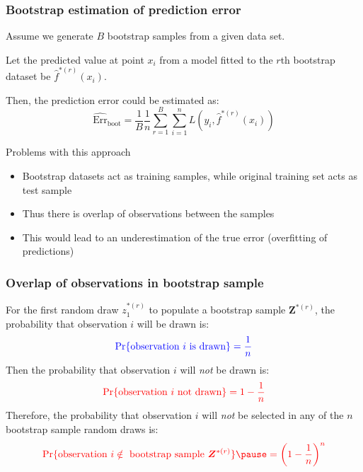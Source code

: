 \documentclass[smaller]{beamer}
\newcommand{\lt}{\left}
\newcommand{\rt}{\right}
\newcommand{\?}{\stackrel{?}{=}}
\newcommand{\fr}{\frac}
\newcommand{\rd}{\color{red}}
\newcommand{\bl}{\color{blue}}
\newcommand{\Err}{\text{Err}}
\begin{document}
 
\begin{frame}
  \frametitle{Bootstrap estimation of prediction error}
  Assume we generate $B$ bootstrap samples from a given data set.\\\pause

  \bigskip

  Let the predicted value at point $x_i$ from a model fitted to the $r$th bootstrap dataset be  $\hat f^{*(r)}(x_i)$. \\ \pause

  \bigskip
  
  Then, the prediction error could be estimated as: \pause
  \begin{equation}
    \widehat{\Err}_{\text{boot}} = \fr1B\fr1n\sum_{r=1}^B\sum_{i=1}^n L(y_i,\hat f^{*(r)}(x_i))
  \end{equation}

  \begin{alertblock}{Problems with this approach}\pause
    \begin{itemize}[<+->]
    \item Bootstrap datasets act as training samples, while original training set acts as test sample
    \item Thus there is overlap of observations between the samples
    \item This would lead to an underestimation of the true error (overfitting of predictions)
    \end{itemize}
  \end{alertblock}
\end{frame}


\begin{frame}
  \frametitle{Overlap of observations in bootstrap sample}
  \pause
  For the first  random draw $z_1^{*(r)}$ to populate a bootstrap sample $\bm Z^{*(r)}$, \pause
  the probability that observation $i$ will be drawn is:\pause
  \begin{equation}\bl
     \Pr\{\text{observation } i \text{ is drawn}\} = \fr 1n
  \end{equation}
  \pause
  Then the probability that observation $i$ will \textit{not} be drawn is:\pause
  \begin{equation}\rd
    \Pr\{\text{observation } i \text{ not drawn}\} = 1 - \fr{1}{n}
  \end{equation}
  \pause
  Therefore, the probability that observation $i$ will \textit{not} be selected in any of the $n$ bootstrap sample random draws is:\pause
  \begin{equation}\rd 
    \Pr\{\text{observation } i \notin \text{ bootstrap sample } \bm Z^{*(r)} \}
    \pause  = \lt(1 - \fr1n\rt)^n
  \end{equation}
\end{frame}
\end{document}
